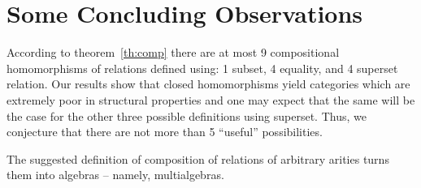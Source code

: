 \documentclass[10pt]{article}
\begin{document}
\section{Some Concluding Observations}

According to theorem~\ref{th:comp} there are at most 9 compositional
homomorphisms of relations defined using: 1 subset, 4 equality, and 4
superset relation. Our results show that closed homomorphisms yield
categories which are extremely poor in structural properties and one
may expect that the same will be the case for the other three possible
definitions using superset. Thus, we conjecture that there are not
more than 5 ``useful'' possibilities.

The suggested definition of composition of relations of arbitrary
arities turns them into algebras -- namely, multialgebras.
\end{document}
